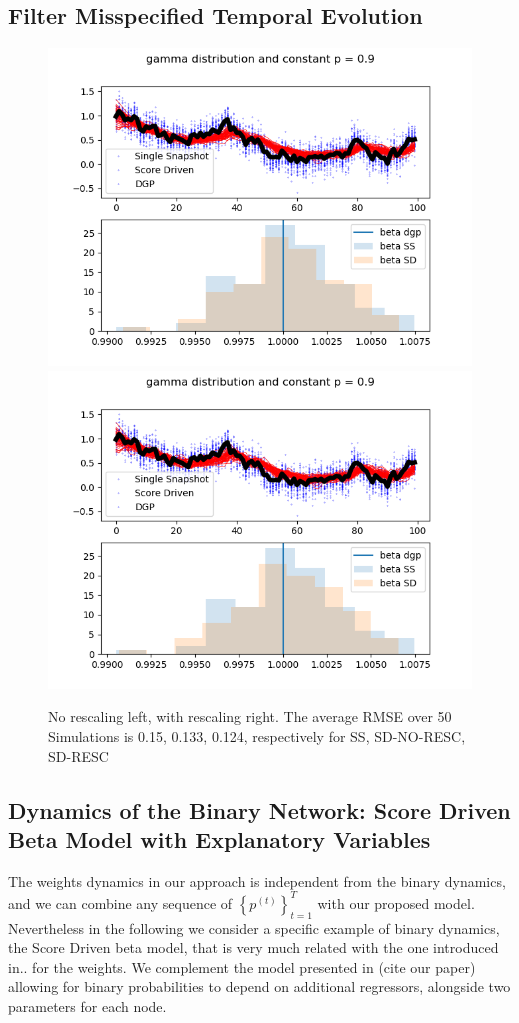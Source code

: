 \documentclass[a4paper,12pt]{article}
\newcommand{\tonde}[1]{\left(#1\right)}
\newcommand{\graffe}[1]{\left\{#1\right\}}
\newcommand{\et}{^{\tonde{t}}}
\begin{document}
\subsection{Filter Misspecified Temporal Evolution} 
\begin{figure}[h]
\includegraphics[width=0.45\linewidth 	]{./figures/missp_filter_ar1_gamma_no_rescale_p_0_9.png}
\includegraphics[width=0.45\linewidth 	]{./figures/missp_filter_ar1_gamma_rescale_p_0_9.png}\\
\caption{No rescaling left, with rescaling right. The average RMSE over 50 Simulations is 0.15, 0.133, 0.124, respectively for SS, SD-NO-RESC, SD-RESC}
\end{figure}
 

\subsection{Dynamics of the Binary Network: Score Driven Beta Model with Explanatory Variables} \label{sec:beta_model}
The weights dynamics in our approach is independent from the binary dynamics, and we can combine any sequence of $\graffe{p\et}_{t=1}^T$ with our proposed model. Nevertheless in the following we consider a specific example of binary dynamics, the Score Driven beta model, that is very much related with the one introduced in.. for the weights. We complement the model presented in (cite our paper) allowing for binary probabilities to depend on additional regressors, alongside two parameters for each node.
\end{document}
